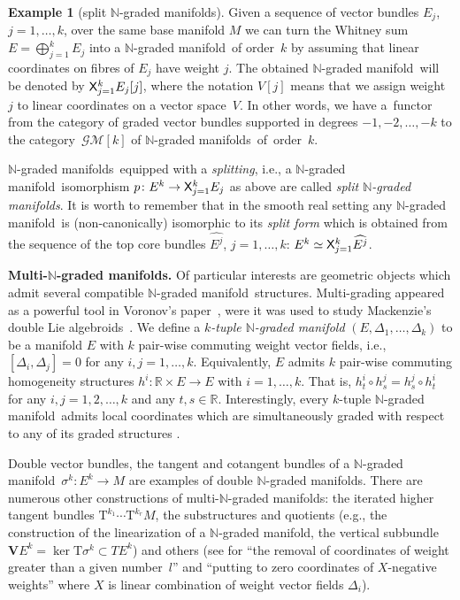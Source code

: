 \documentclass[pdftex]{sigma}
\newcommand{\grB}{{$\N$-graded manifold}}
\newcommand{\grBs}{{$\N$-graded manifolds}}
\newcommand{\degree}{{order}}
\newcommand{\R}{\mathbb{R}}
\newcommand{\N}{\mathbb{N}}
\newcommand{\V}{\mathbf{V}} %
\newcommand{\ra}{\rightarrow}
\newcommand{\Cross}{{\sf X}} %
\newcommand{\T}{\mathrm{T}} %
\newcommand{\core}[1]{\widehat{#1}} %
\newcommand{\catGB}{\mathcal{GM}}
\numberwithin{equation}{section}
\theoremstyle{definition}
\newtheorem{ex}[thm]{Example}
\begin{document}
\begin{ex}[split \grBs]\label{ex:split_gr_bndl} Given a sequence of vector bundles $E_j$, $j=1, \ldots, k$, over the same base manifold $M$ we can turn the Whitney sum $E =\bigoplus_{j=1}^k E_j$ into a \grB\ of \degree\ $k$ by assuming that linear coordinates on fibres of $E_j$ have weight $j$. The obtained \grB\ will be denoted by $\Cross_{j=1}^k E_j[j]$, where the notation $V[j]$ means that we assign weight $j$ to linear coordinates on a vector space~$V$. In other words, we have a~functor from the category of graded vector bundles supported in degrees $-1, -2, \ldots, -k$ to the category~$\catGB[k]$ of \grBs\ of~\degree\ $k$.

\grBs\ equipped with a \emph{splitting}, i.e., a \grB\ isomorphism $p\colon E^k \ra \Cross_{j=1}^k E_j$ as above are called \emph{split \grBs}. It is worth to remember that in the smooth real setting any \grB\ is (non-canonically) isomorphic to its \emph{split form} which is obtained from the sequence of the top core bundles $\core{E^j}$, $j=1, \ldots, k$: $E^k \simeq \Cross_{j=1}^k \core{E^j}$.
\end{ex}

{\bf Multi-\grBs.} Of particular interests are geometric objects which admit several compatible \grB\ structures. Multi-grading appeared as a powerful tool in Voronov's paper~\cite{Voronov_2012}, were it was used to study Mackenzie's double Lie algebroids~\cite{Mackenzie_1992}.
We define a \emph{$k$-tuple \grB} $(E, \Delta_1, \ldots, \Delta_k)$ to be a manifold $E$ with $k$ pair-wise commuting weight vector fields, i.e., $[\Delta_i,\Delta_j]=0$ for any $i,j=1,\hdots,k$. Equivalently, $E$ admits $k$ pair-wise commuting homogeneity structures $h^i\colon \R\times E\ra E$ with $i=1,\hdots,k$. That is, $h^i_t\circ h^j_s=h^j_s\circ h^i_t$ for any $i,j=1,2,\hdots,k$ and any $t,s\in\R$.
Interestingly, every $k$-tuple \grB\ admits local coordinates which are simultaneously graded with respect to any of its graded structures \cite[Theorem 5.2]{JG_MR_gr_bund_hgm_str_2011}.

 Double vector bundles, the tangent and cotangent bundles of a \grB\ \mbox{$\sigma^k\colon\! E^k{\ra} M$} are examples of double \grBs. There are numerous other constructions of multi-\grBs: the iterated higher tangent bundles $\T^{k_1} \cdots \T^{k_r} M$, the substructures and quotients (e.g., the construction of the linearization of a \grB, the vertical subbundle $\V E^k = \ker{\T \sigma^k} \subset T E^k$) and others (see \cite[Definitions~1.6 and~1.8]{BGR} for ``the removal of coordinates of weight greater than a given number~$l$'' and ``putting to zero coordinates of $X$-negative weights'' where $X$ is linear combination of weight vector fields $\Delta_i$).
\end{document}
